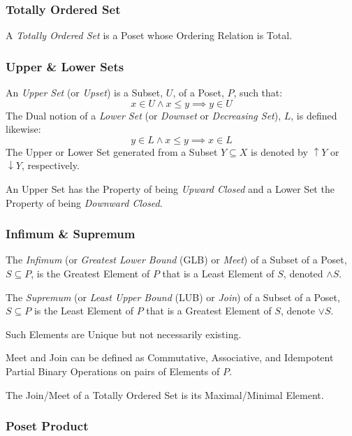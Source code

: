 \documentclass{article}
\begin{document}
\subsubsection{Totally Ordered Set}\label{subsec:total_order}

A \emph{Totally Ordered Set} is a Poset whose Ordering Relation is
Total.



\subsubsection{Upper \& Lower Sets}\label{subsec:upper_lower}

An \emph{Upper Set} (or \emph{Upset}) is a Subset, $U$, of a Poset,
$P$, such that:
\[
    x \in U \wedge x \leq y \implies y \in U
\]
The Dual notion of a \emph{Lower Set} (or \emph{Downset} or
\emph{Decreasing Set}), $L$, is defined likewise:
\[
    y \in L \wedge x \leq y \implies x \in L
\]
The Upper or Lower Set generated from a Subset $Y \subseteq X$ is
denoted by $\uparrow Y$ or $\downarrow Y$, respectively.

An Upper Set has the Property of being \emph{Upward Closed} and a
Lower Set the Property of being \emph{Downward Closed}.



\subsubsection{Infimum \& Supremum}\label{subsec:glb_lub}

The \emph{Infimum} (or \emph{Greatest Lower Bound} (GLB) or
\emph{Meet}) of a Subset of a Poset, $S \subseteq P$, is the Greatest
Element of $P$ that is a Least Element of $S$, denoted $\wedge S$.

The \emph{Supremum} (or \emph{Least Upper Bound} (LUB) or \emph{Join})
of a Subset of a Poset, $S \subseteq P$ is the Least Element of $P$
that is a Greatest Element of $S$, denote $\vee S$.

Such Elements are Unique but not necessarily existing.

Meet and Join can be defined as Commutative, Associative, and
Idempotent Partial Binary Operations on pairs of Elements of $P$.

The Join/Meet of a Totally Ordered Set is its Maximal/Minimal Element.



\subsubsection{Poset Product}\label{subsec:poset_product}
\end{document}
